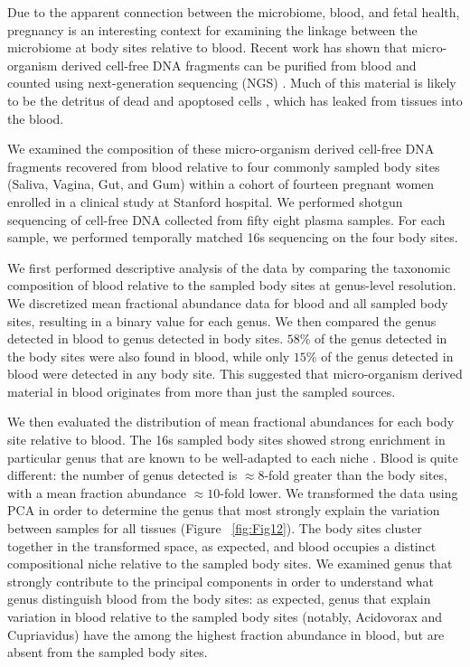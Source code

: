 Due to the apparent connection between the microbiome, blood, and fetal health, pregnancy is an interesting context for examining the linkage between the microbiome at body sites relative to blood. Recent work has shown that micro-organism derived cell-free DNA fragments can be purified from blood and counted using next-generation sequencing (NGS) \cite{DeVlaminck:2013hl}. Much of this material is likely to be the detritus of dead and apoptosed cells \cite{Quake:2012iy}, which has leaked from tissues into the blood.  

We examined the composition of these micro-organism derived cell-free DNA fragments recovered from blood relative to four commonly sampled body sites (Saliva, Vagina, Gut, and Gum) within a cohort of fourteen pregnant women enrolled in a clinical study at Stanford hospital.  We performed shotgun sequencing of cell-free DNA collected from fifty eight plasma samples. For each sample, we performed temporally matched 16s sequencing on the four body sites.

We first performed descriptive analysis of the data by comparing the taxonomic composition of blood relative to the sampled body sites at genus-level resolution. We discretized mean fractional abundance data for blood and all sampled body sites, resulting in a binary value for each genus. We then compared the genus detected in blood to genus detected in body sites. $58$\% of the genus detected in the body sites were also found in blood, while only $15$\% of the genus detected in blood were detected in any body site. This suggested that micro-organism derived material in blood originates from more than just the sampled sources.

We then evaluated the distribution of mean fractional abundances for each body site relative to blood. The 16s sampled body sites showed strong enrichment in particular genus that are known to be well-adapted to each niche \cite{Consortium:2012bb}. Blood is quite different: the number of genus detected is $\approx 8$-fold greater than the body sites, with a mean fraction abundance $\approx 10$-fold lower. We transformed the data using PCA in order to determine the genus that most strongly explain the variation between samples for all tissues (Figure ~\ref{fig:Fig12}). The body sites cluster together in the transformed space, as expected, and blood occupies a distinct compositional niche relative to the sampled body sites. We examined genus that strongly contribute to the principal components in order to understand what genus distinguish blood from the body sites: as expected, genus that explain variation in blood relative to the sampled body sites (notably, Acidovorax and Cupriavidus) have the among the highest fraction abundance in blood, but are absent from the sampled body sites. 

